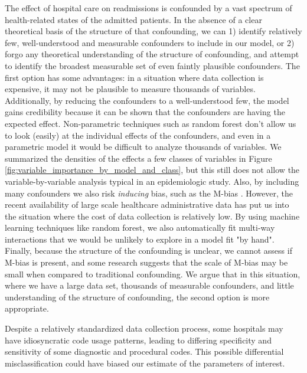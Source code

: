 \documentclass[]{article}\usepackage[]{graphicx}\usepackage[]{color}
\begin{document}
The effect of hospital care on readmissions is confounded by a vast spectrum of health-related states of the admitted patients. In the absence of a clear theoretical basis of the structure of that confounding, we can 1) identify relatively few, well-understood and measurable confounders to include in our model, or 2) forgo any theoretical understanding of the structure of confounding, and attempt to identify the broadest measurable set of even faintly plausible confounders. The first option has some advantages: in a situation where data collection is expensive, it may not be plausible to measure thousands of variables. Additionally, by reducing the confounders to a well-understood few, the model gains credibility because it can be shown that the confounders are having the expected effect. Non-parametric techniques such as random forest don't allow us to look (easily) at the individual effects of the confounders, and even in a parametric model it would be difficult to analyze thousands of variables. We summarized the densities of the effects a few classes of variables in Figure \ref{fig:variable_importance_by_model_and_class}, but this still does not allow the variable-by-variable analysis typical in an epidemiologic study. Also, by including many confounders we also risk \emph{inducing} bias, such as the M-bias \supercite{pearl_causal_1995,greenland_quantifying_2003}. However, the recent availability of large scale healthcare administrative data has put us into the situation where the cost of data collection is relatively low. By using machine learning techniques like random forest, we also automatically fit multi-way interactions that we would be unlikely to explore in a model fit "by hand". Finally, because the structure of the confounding is unclear, we cannot assess if M-bias is present, and some research suggests that the scale of M-bias may be small when compared to traditional confounding.\supercite{liu_implications_2012} We argue that in this situation, where we have a large data set, thousands of measurable confounders, and little understanding of the structure of confounding, the second option is more appropriate.

Despite a relatively standardized data collection process, some hospitals may have idiosyncratic code usage patterns, leading to differing specificity and sensitivity of some diagnostic and procedural codes. This possible differential misclassification could have biased our estimate of the parameters of interest.
\end{document}
